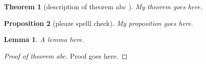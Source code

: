 \documentclass{article}
\theoremstyle{plain}
\newtheorem{thm}{Theorem}[section]
\newtheorem{prp}[thm]{Proposition}
\newtheorem{lemma}{Lemma}
\begin{document}
\begin{thm}[description of theorem abc \cite{abc}]
  My theorem goes here.
\end{thm}

\begin{prp}[pleaze spelll check]
  My proposition goes here.
\end{prp}

\begin{lemma}
  A lemma here.
\end{lemma}

\begin{proof}[Proof of theorem abc]
    Proof goes here.
\end{proof}
\end{document}
